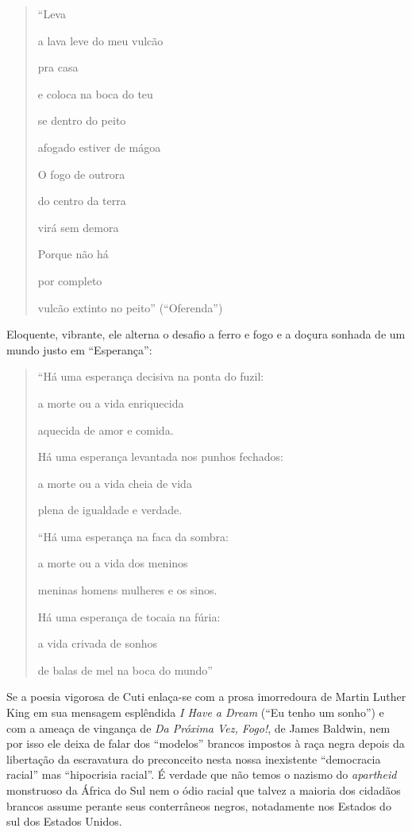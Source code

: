\documentclass[
  letterpaper,
  DIV=11,
  numbers=noendperiod]{scrreprt}
\begin{document}
\begin{quote}
``Leva

a lava leve do meu vulcão~

pra casa~

e coloca na boca do teu~

se dentro do peito~

afogado estiver de mágoa~

O fogo de outrora~

do centro da terra~

virá sem demora~

Porque não há~

por completo~

vulcão extinto no peito'' (``Oferenda'')
\end{quote}

Eloquente, vibrante, ele alterna o desafio a ferro e fogo e a doçura
sonhada de um mundo justo em ``Esperança'':

\begin{quote}
``Há uma esperança decisiva na ponta do fuzil:~

a morte ou a vida enriquecida~

aquecida de amor e comida.~

Há uma esperança levantada nos punhos fechados:~

a morte ou a vida cheia de vida~

plena de igualdade e verdade.~

``Há uma esperança na faca da sombra:~

a morte ou a vida dos meninos~

meninas homens mulheres e os sinos.~

Há uma esperança de tocaia na fúria:~

a vida crivada de sonhos~

de balas de mel na boca do mundo''
\end{quote}

Se a poesia vigorosa de Cuti enlaça-se com a prosa imorredoura de Martin
Luther King em sua mensagem esplêndida \emph{I Have a Dream} (``Eu tenho
um sonho'') e com a ameaça de vingança de \emph{Da Próxima Vez, Fogo!},
de James Baldwin, nem por isso ele deixa de falar dos ``modelos''
brancos impostos à raça negra depois da libertação da escravatura do
preconceito nesta nossa inexistente ``democracia racial'' mas
``hipocrisia racial''. É verdade que não temos o nazismo do
\emph{apartheid} monstruoso da África do Sul nem o ódio racial que
talvez a maioria dos cidadãos brancos assume perante seus conterrâneos
negros, notadamente nos Estados do sul dos Estados Unidos.
\end{document}
